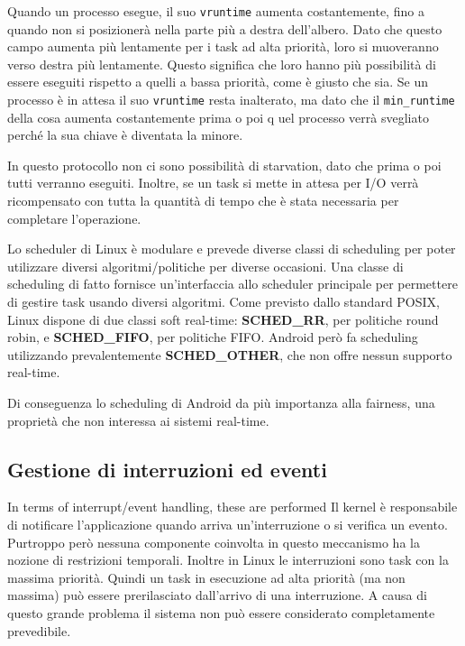 Quando un processo esegue, il suo \texttt{vruntime} aumenta costantemente, fino a quando non si posizionerà nella parte più a destra dell'albero. Dato che questo campo aumenta più lentamente per i task ad alta priorità, loro si muoveranno verso destra più lentamente. Questo significa che loro hanno più possibilità di essere eseguiti rispetto a quelli a bassa priorità, come è giusto che sia. Se un processo è in attesa il suo \texttt{vruntime} resta inalterato, ma dato che il \texttt{min\_runtime} della cosa aumenta costantemente prima o poi q	uel processo verrà svegliato perché la sua chiave è diventata la minore. 

In questo protocollo non ci sono possibilità di starvation, dato che prima o poi tutti verranno eseguiti. Inoltre, se un task si mette in attesa per I/O verrà ricompensato con tutta la quantità di tempo che è stata necessaria per completare l'operazione. 

Lo scheduler di Linux è modulare e prevede diverse classi di scheduling per poter utilizzare diversi algoritmi/politiche per diverse occasioni. Una classe di scheduling di fatto fornisce un'interfaccia allo scheduler principale per permettere di gestire task usando diversi algoritmi. Come previsto dallo standard POSIX, Linux dispone di due classi soft real-time: \textbf{SCHED\_RR}, per politiche round robin, e \textbf{SCHED\_FIFO}, per politiche FIFO. Android però fa scheduling utilizzando prevalentemente \textbf{SCHED\_OTHER}, che non offre nessun supporto real-time.

Di conseguenza lo scheduling di Android da più importanza alla fairness, una proprietà che non interessa ai sistemi real-time. 

\subsection{Gestione di interruzioni ed eventi}In terms of interrupt/event handling, these are performed
Il kernel è responsabile di notificare l'applicazione quando arriva un'interruzione o si verifica un evento. Purtroppo però nessuna componente coinvolta in questo meccanismo ha la nozione di restrizioni temporali. Inoltre in Linux le interruzioni sono task con la massima priorità. Quindi un task in esecuzione ad alta priorità (ma non massima) può essere prerilasciato dall'arrivo di una interruzione. A causa di questo grande problema il sistema non può essere considerato completamente prevedibile.
